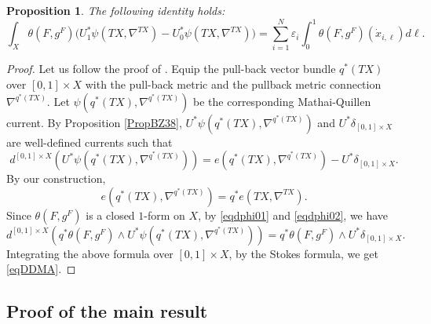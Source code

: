 \documentclass[11pt]{article}
\numberwithin{equation}{section}
\theoremstyle{plain}
\newtheorem{prop}[lem]{Proposition}
\theoremstyle{definition}
\theoremstyle{remark}
\let\e\varepsilon
\begin{document}
\begin{prop}\label{propBZVVa}
The following identity holds:
\begin{equation}\label{eqDDMA}
\int_{X}\theta(F,g^{F})
\Big(U_{1}^{*}\psi(TX,\nabla^{TX})-
U_{0}^{*}\psi(TX,\nabla^{TX})\Big)
=\sum_{i=1}^{N}\e_{i}\int_{0}^{1}\theta(F,g^{F})(\dot{x}_{i,\ell})d\ell.
\end{equation}
\end{prop}
\begin{proof}
Let us follow the proof of \cite[Prop.\,6.1, Prop.\,6.4]{BZ92}. Equip the pull-back vector bundle
$q^{*}(TX)$ over $[0,1]\times X$ with the pull-back metric and the pullback metric
connection $\nabla^{q^{*}(TX)}$. Let
$\psi(q^{*}(TX),\nabla^{q^{*}(TX)})$ be the corresponding
Mathai-Quillen current. By Proposition \ref{PropBZ38},
$U^{*}\psi(q^{*}(TX),\nabla^{q^{*}(TX)})$ and
$U^{*}\delta_{[0,1]\times X}$ are well-defined currents such that
\begin{equation}\label{eqdphi01}
d^{[0,1]\times X} (
U^{*}\psi(q^{*}(TX),\nabla^{q^{*}(TX)}))=e(q^{*}(TX),\nabla^{q^{*}(TX)})-U^{*}\delta_{[0,1]\times X}.
\end{equation}
By our construction,
\begin{equation}\label{eqdphi02}
e(q^{*}(TX),\nabla^{q^{*}(TX)})=q^{*}e(TX,\nabla^{TX}).
\end{equation}
Since $\theta(F,g^{F})$ is a closed $1$-form on $X$, by
\eqref{eqdphi01} and \eqref{eqdphi02}, we have
\begin{equation*}
d^{[0,1]\times X} (q^{*}\theta(F,g^{F}) \wedge
U^{*}\psi(q^{*}(TX),\nabla^{q^{*}(TX)}))
=q^{*}\theta(F,g^{F}) \wedge U^{*}\delta_{[0,1]\times X}.
\end{equation*}
Integrating the above formula over $[0,1]\times X$, by the Stokes
formula, we get \eqref{eqDDMA}.
\end{proof}

\subsection{Proof of the main result}\label{s33}
\end{document}
